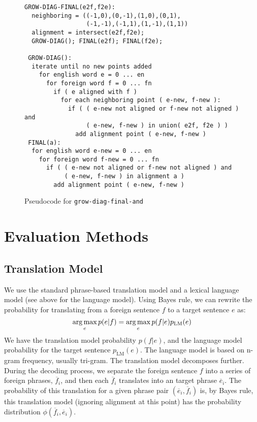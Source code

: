 \documentclass[twocolumn]{article}
\newcommand{\originalAlign}{\texttt{grow-diag-final-and}}
\begin{document}
\begin{figure*}[t]
\begin{Verbatim}[frame=single]
GROW-DIAG-FINAL(e2f,f2e):
  neighboring = ((-1,0),(0,-1),(1,0),(0,1),
                 (-1,-1),(-1,1),(1,-1),(1,1))
  alignment = intersect(e2f,f2e);
  GROW-DIAG(); FINAL(e2f); FINAL(f2e);

 GROW-DIAG():
  iterate until no new points added
    for english word e = 0 ... en
      for foreign word f = 0 ... fn
        if ( e aligned with f )
          for each neighboring point ( e-new, f-new ):
            if ( ( e-new not aligned or f-new not aligned ) and
                 ( e-new, f-new ) in union( e2f, f2e ) )
              add alignment point ( e-new, f-new )
 FINAL(a):
  for english word e-new = 0 ... en
    for foreign word f-new = 0 ... fn
      if ( ( e-new not aligned or f-new not aligned ) and
           ( e-new, f-new ) in alignment a )
        add alignment point ( e-new, f-new )
\end{Verbatim}
\caption{Pseudocode for \originalAlign{}}
\label{fig:growDiagPseudo}
\end{figure*}



\section{Evaluation Methods}
\subsection{Translation Model}
We use the standard phrase-based translation model and a lexical language
model (see above for the language model).
Using Bayes rule, we can rewrite the probability for translating from a
foreign sentence $f$ to a target sentence $e$ as:
\[
  \operatorname*{arg\,max}_e p(e|f) = \operatorname*{arg\,max}_e p(f|e) p_{\text{LM}}(e)
\]
We have the translation model probability $p(f|e)$, and the language model
probability for the target sentence $p_{\text{LM}}(e)$.
The language model is based on n-gram frequency, usually tri-gram.
The translation model decomposes further. During the decoding
process, we separate the foreign sentence $f$ into a series of foreign phrases,
$\overline{f}_i$, and then each $\overline{f}_i$ translates into an target
phrase $\overline{e}_i$. The probability of this translation for a given phrase
pair $(\overline{e}_i, \overline{f}_i)$ is, by Bayes rule, this translation
model (ignoring alignment at this point) has the probability distribution
$\phi(\overline{f}_i, \overline{e}_i)$.
\end{document}
